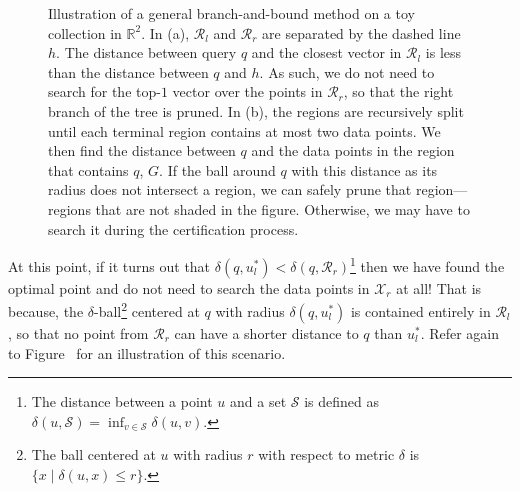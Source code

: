 \begin{figure}[t]
    \centering

    \caption{Illustration of a general branch-and-bound method on a toy collection in $\mathbb{R}^2$.
    In (a), $\mathcal{R}_l$ and $\mathcal{R}_r$ are separated by the dashed line $h$.
    The distance between query $q$ and the closest vector in $\mathcal{R}_l$ is less than the distance between $q$ and
    $h$. As such, we do not need to search for the top-$1$ vector
    over the points in $\mathcal{R}_r$, so that the right branch of the tree is pruned.
    In (b), the regions are recursively split until each
    terminal region contains at most two data points.
    We then find the distance between $q$ and the data points in the region that contains $q$, $G$.
    If the ball around $q$ with this distance as its radius does not intersect a region, we can safely prune
    that region---regions that are not shaded in the figure.
    Otherwise, we may have to search it during the certification process.}
    \label{figure:branch-and-bound:motivation}
\end{figure}

At this point, if it turns out that $\delta(q, u_l^\ast) < \delta(q, \mathcal{R}_r)$\footnote{
The distance between a point $u$ and a set $\mathcal{S}$ is defined as
$\delta(u, \mathcal{S}) = \inf_{v \in \mathcal{S}} \delta(u, v)$.}
then we have found the optimal point and do not need to search the data points in $\mathcal{X}_r$ at all!
That is because, the $\delta$-ball\footnote{The ball centered at $u$ with radius $r$ with respect to metric $\delta$
is $\{ x \;|\; \delta(u, x) \leq r \}$.}
centered at $q$ with radius $\delta(q, u_l^\ast)$ is contained entirely in $\mathcal{R}_l$,
so that no point from $\mathcal{R}_r$ can have a shorter distance to $q$ than $u_l^\ast$.
Refer again to Figure~ for an
illustration of this scenario.

